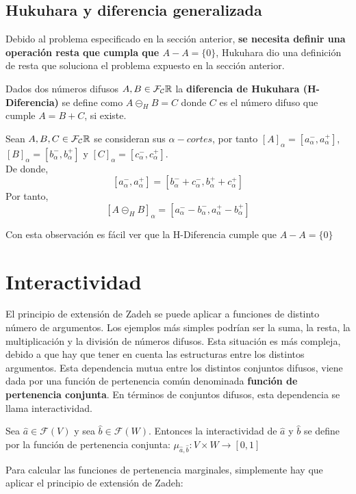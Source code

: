   \subsection{Hukuhara y diferencia generalizada} \label{def:hukukara}
  Debido al problema especificado en la sección anterior, \textbf{se necesita definir una operación resta que cumpla que $A-A=\{0\}$}, Hukuhara dio una definición de resta que soluciona el problema expuesto en la sección anterior.

  \begin{definicion}
    Dados dos números difusos $A, B \in \mathcal{F}_\mathcal{C}\mathbb R$ la \textbf{diferencia de Hukuhara (H-Diferencia)} se define como $A \circleddash_H B = C$ donde $C$ es el número difuso que cumple $A=B+C$, si existe.
  \end{definicion}

  \begin{observacion}
    Sean $A, B, C \in \mathcal{F}_\mathcal{C}\mathbb R$ se consideran sus $\alpha - cortes$, por tanto $[A]_\alpha = [a^-_\alpha, a^+_\alpha]$, $[B]_\alpha = [b^-_\alpha, b^+_\alpha]$ y $[C]_\alpha = [c^-_\alpha, c^+_\alpha]$. \\
    De donde,
    $$
    [a^-_\alpha, a^+_\alpha] = [b^-_\alpha + c^-_\alpha, b^+_\alpha + c^+_\alpha]
    $$
    Por tanto, 
    $$
    [A \circleddash_H B]_\alpha = [a_\alpha^- - b_\alpha^-, a_\alpha^+ - b_\alpha^+]
    $$
  \end{observacion}
  Con esta observación es fácil ver que la H-Diferencia cumple que $A-A=\{0\}$


  \section{Interactividad}
  El principio de extensión de Zadeh se puede aplicar a funciones de distinto número de argumentos. Los ejemplos más simples podrían ser la suma, la resta, la multiplicación y la división de números difusos. Esta situación es más compleja, debido a que hay que tener en cuenta las estructuras entre los distintos argumentos. Esta dependencia mutua entre los distintos conjuntos difusos, viene dada por una función de pertenencia común denominada \textbf{función de pertenencia conjunta}. En términos de conjuntos difusos, esta dependencia se llama interactividad.

  \begin{definicion}
    Sea $\hat{a} \in \mathcal{F}(V)$ y sea $\hat{b} \in \mathcal{F}(W)$. Entonces la interactividad de $\hat{a}$ y $\hat{b}$ se define por la función de pertenencia conjunta: $\mu_{\hat{a}, \hat{b}} : V \times W \rightarrow [0, 1]$
  \end{definicion}
  Para calcular las funciones de pertenencia marginales, simplemente hay que aplicar el principio de extensión de Zadeh:

